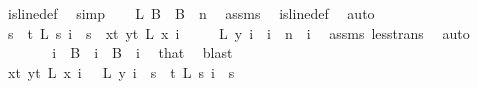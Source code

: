 \begin{isabellebody}
\ is{\isacharunderscore}{\kern0pt}line{\isacharunderscore}{\kern0pt}def\ \isamarkupfalse%
\ simp\isanewline
\isanewline
\ \ \isamarkupfalse%
\ L{}{\isacharcolon}{\kern0pt}\ {\isachardoublequoteopen}{\isacharquery}{\kern0pt}B{}\ {\isasymunion}\ {\isacharquery}{\kern0pt}B{}\ {\isacharequal}{\kern0pt}\ {\isacharbraceleft}{\kern0pt}{\isachardot}{\kern0pt}{\isachardot}{\kern0pt}{\isacharless}{\kern0pt}n{\isacharbraceright}{\kern0pt}{\isachardoublequoteclose}\ \isamarkupfalse%
\ assms{\isacharparenleft}{\kern0pt}{}{\isacharparenright}{\kern0pt}\ \isamarkupfalse%
\ is{\isacharunderscore}{\kern0pt}line{\isacharunderscore}{\kern0pt}def\ \isamarkupfalse%
\ auto\isanewline
\ \ \isacommand{{\isacharbraceleft}{\kern0pt}}\isamarkupfalse%
\isanewline
\ \ \ \ \isamarkupfalse%
\ {\isachardoublequoteopen}{\isacharparenleft}{\kern0pt}{\isasymforall}s\ {\isacharless}{\kern0pt}\ t{\isachardot}{\kern0pt}\ L\ s\ i\ {\isacharequal}{\kern0pt}\ s{\isacharparenright}{\kern0pt}\ {\isasymlongrightarrow}\ {\isasymnot}{\isacharparenleft}{\kern0pt}{\isasymforall}x{\isacharless}{\kern0pt}t{\isachardot}{\kern0pt}\ {\isasymforall}y{\isacharless}{\kern0pt}t{\isachardot}{\kern0pt}\ L\ x\ i\ {\isacharequal}{\kern0pt}\isanewline
\ \ \ \ L\ y\ i{\isacharparenright}{\kern0pt}{\isachardoublequoteclose}\ \ {\isachardoublequoteopen}i\ {\isacharless}{\kern0pt}\ n{\isachardoublequoteclose}\ \ i\ \isamarkupfalse%
\ assms{\isacharparenleft}{\kern0pt}{}{\isacharparenright}{\kern0pt}\ less{\isacharunderscore}{\kern0pt}trans\ \isamarkupfalse%
\ auto\ \isanewline
\ \ \ \ \isamarkupfalse%
\ \isamarkupfalse%
\ {\isacharasterisk}{\kern0pt}{\isacharcolon}{\kern0pt}{\isachardoublequoteopen}i\ {\isasymnotin}\ {\isacharquery}{\kern0pt}B{}{\isachardoublequoteclose}\ \ {\isachardoublequoteopen}i\ {\isasymin}\ {\isacharquery}{\kern0pt}B{}{\isachardoublequoteclose}\ \ i\ \isamarkupfalse%
\ that\ \isamarkupfalse%
\ blast\isanewline
\ \ \isacommand{{\isacharbraceright}{\kern0pt}}\isamarkupfalse%
\isanewline
\ \ \isamarkupfalse%
\isanewline
\ \ \isacommand{{\isacharbraceleft}{\kern0pt}}\isamarkupfalse%
\isanewline
\ \ \ \ \isamarkupfalse%
\ {\isachardoublequoteopen}{\isacharparenleft}{\kern0pt}{\isasymforall}x{\isacharless}{\kern0pt}t{\isachardot}{\kern0pt}\ {\isasymforall}y{\isacharless}{\kern0pt}t{\isachardot}{\kern0pt}\ L\ x\ i\ {\isacharequal}{\kern0pt}\ \ L\ y\ i{\isacharparenright}{\kern0pt}\ {\isasymlongrightarrow}\ {\isasymnot}{\isacharparenleft}{\kern0pt}{\isasymforall}s\ {\isacharless}{\kern0pt}\ t{\isachardot}{\kern0pt}\ L\ s\ i\ {\isacharequal}{\kern0pt}\ s{\isacharparenright}{\kern0pt}{\isachardoublequoteclose}\ \isanewline

\end{isabellebody}

